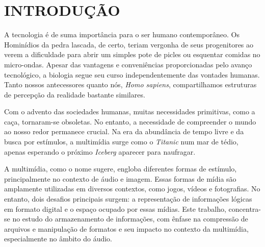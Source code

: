 \captionsetup{justification=centering,margin=0cm}

\chapter[INTRODUÇÃO]{INTRODUÇÃO}

A tecnologia é de suma importância para o ser humano contemporâneo. Os Hominídios da pedra lascada, de certo, teriam vergonha de seus progenitores ao verem a dificuldade para abrir um simples pote de picles ou esquentar comidas no micro-ondas. Apesar das vantagens e conveniências proporcionadas pelo avanço tecnológico, a biologia segue seu curso independentemente das vontades humanas. Tanto nossos antecessores quanto nós, \textit{Homo sapiens}, compartilhamos estruturas de percepção da realidade bastante similares.

\hspace{1.5 cm} Com o advento das sociedades humanas, muitas necessidades primitivas, como a caça, tornaram-se obsoletas. No entanto, a necessidade de compreender o mundo ao nosso redor permanece crucial. Na era da abundância de tempo livre e da busca por estímulos, a multimídia surge como o \textit{Titanic} num mar de tédio, apenas esperando o próximo \textit{Iceberg} aparecer para naufragar. 

\hspace{1.5 cm} A multimídia, como o nome sugere, engloba diferentes formas de estímulo, principalmente no contexto de áudio e imagem. Essas formas de mídia são amplamente utilizadas em diversos contextos, como jogos, vídeos e fotografias. No entanto, dois desafios principais surgem: a representação de informações lógicas em formato digital e o espaço ocupado por essas mídias. Este trabalho, concentra-se no estudo do armazenamento de informações, com ênfase na compressão de arquivos e manipulação de formatos e seu impacto no contexto da multimídia, especialmente no âmbito do áudio.